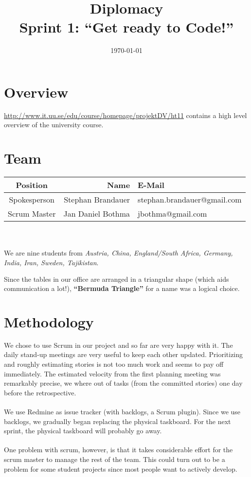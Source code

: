 \documentclass[11pt,a4paper]{article}
\begin{document}
\title{Diplomacy \\
  Sprint 1: ``Get ready to Code!''}
\date{\today}
\maketitle

\section{Overview}
\url{http://www.it.uu.se/edu/course/homepage/projektDV/ht11} contains a high level overview of the university course.

\section{Team}
\begin{tabular}{c|rl}
Position     & Name              & E-Mail \\
\hline
Spokesperson & Stephan Brandauer & stephan.brandauer@gmail.com \\
Scrum Master & Jan Daniel Bothma & jbothma@gmail.com
\end{tabular}
\\
\\
We are nine students from {\em Austria, China, England/South Africa, Germany, India, Iran, Sweden, Tajikistan}.

Since the tables in our office are arranged in a triangular shape (which aids communication a lot!),
{\bf ``Bermuda Triangle''} for a name was a logical choice.

\section{Methodology}
We chose to use Scrum in our project and so far are very happy with it.
The daily stand-up meetings are very useful to keep each other updated.
Prioritizing and roughly estimating stories is not too much work and seems to pay off immediately.
The estimated velocity from the first planning meeting was remarkably precise, we where out of tasks
(from the committed stories) one day before the retrospective.
\\
\\
We use Redmine as issue tracker (with backlogs, a Scrum plugin). Since we use backlogs,
we gradually began replacing the physical taskboard. For the next sprint,
the physical taskboard will probably go away.
\\
\\
One problem with scrum, however, is that it takes considerable effort for the scrum master to manage the rest of the team.
This could turn out to be a problem for some student projects since most people want to actively develop.
\end{document}
